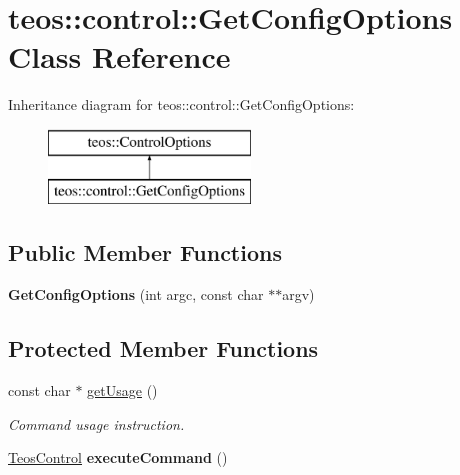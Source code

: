 \hypertarget{classteos_1_1control_1_1_get_config_options}{}\section{teos\+:\+:control\+:\+:Get\+Config\+Options Class Reference}
\label{classteos_1_1control_1_1_get_config_options}
Inheritance diagram for teos\+:\+:control\+:\+:Get\+Config\+Options\+:\begin{figure}[H]
\begin{center}
\leavevmode
\includegraphics[height=2.000000cm]{classteos_1_1control_1_1_get_config_options}
\end{center}
\end{figure}
\subsection*{Public Member Functions}
\begin{DoxyCompactItemize}
\item 
\mbox{\label{classteos_1_1control_1_1_get_config_options_ac0b1b2f54b11f08161adc68e5f8f6aa0}} 
{\bfseries Get\+Config\+Options} (int argc, const char $\ast$$\ast$argv)
\end{DoxyCompactItemize}
\subsection*{Protected Member Functions}
\begin{DoxyCompactItemize}
\item 
const char $\ast$ \mbox{\hyperlink{classteos_1_1control_1_1_get_config_options_a144b88309b989f2282da43ad56ddb1a6}{get\+Usage}} ()
\begin{DoxyCompactList}\small\item\em Command \textquotesingle{}usage\textquotesingle{} instruction. \end{DoxyCompactList}\item 
\mbox{\label{classteos_1_1control_1_1_get_config_options_a842924b3643e7830d15f567f89dfc4a2}} 
\mbox{\hyperlink{classteos_1_1_teos_control}{Teos\+Control}} {\bfseries execute\+Command} ()
\end{DoxyCompactItemize}
